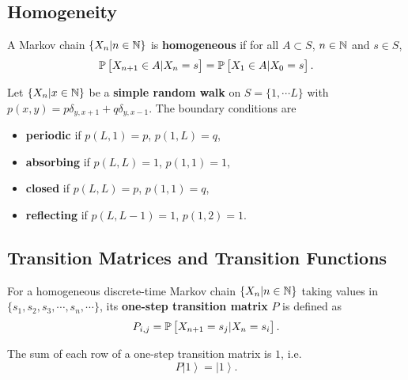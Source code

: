 \subsection{Homogeneity}

\begin{definition}[Homogeneity]
    A Markov chain $\{ X_n | n \in \mathbb{N} \}$ is \textbf{homogeneous} if for all $A \subset S$, $n \in \mathbb{N}$ and $s \in S$, 
    \begin{equation*}
        \mathbb{P} \left[ X_{n+1} \in A | X_n = s \right] = \mathbb{P} \left[ X_1 \in A | X_0 = s \right].
    \end{equation*}
\end{definition}

\begin{example}
    Let $\{ X_n | x \in \mathbb{N} \}$ be a \textbf{simple random walk} on $S = \{ 1, \cdots L \}$ with $p(x,y) = p \delta_{y, x+1} + q \delta_{y, x-1}$. The boundary conditions are 
    \begin{itemize}
        \item \textbf{\textcolor{myblue}{periodic}} if $p(L,1) = p$, $p(1,L) = q$,
        \item \textbf{\textcolor{myblue}{absorbing}} if $p(L,L) = 1$, $p(1,1) = 1$,
        \item \textbf{\textcolor{myblue}{closed}} if $p(L,L) = p$, $p(1,1) = q$,
        \item \textbf{\textcolor{myblue}{reflecting}} if $p(L, L-1) = 1$, $p(1,2) = 1$.
    \end{itemize}
\end{example}

\subsection{Transition Matrices and Transition Functions}

\begin{definition}
    For a homogeneous discrete-time Markov chain $\{X_n | n \in \mathbb{N}\}$ taking values in $\{s_1, s_2, s_3, \cdots, s_n, \cdots\}$, its \textbf{one-step transition matrix} $P$ is defined as
    \begin{equation*}
        P_{i,j} = \mathbb{P} \left[ X_{n+1} = s_j | X_n = s_i \right].
    \end{equation*}
\end{definition}

\begin{remark}
    The sum of each row of a one-step transition matrix is $1$, i.e. 
    \begin{equation*}
        P \left| 1 \right> = \left| 1 \right>.
    \end{equation*}
\end{remark}

